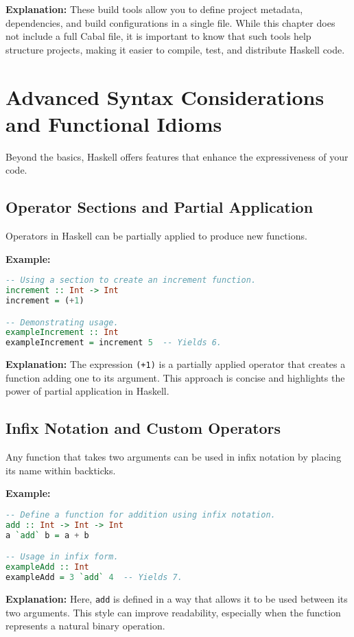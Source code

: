 \documentclass[11pt,a4paper]{article}
\begin{document}
\textbf{Explanation:}  
These build tools allow you to define project metadata, dependencies, and build configurations in a single file. While this chapter does not include a full Cabal file, it is important to know that such tools help structure projects, making it easier to compile, test, and distribute Haskell code.

\section{Advanced Syntax Considerations and Functional Idioms}
Beyond the basics, Haskell offers features that enhance the expressiveness of your code.

\subsection{Operator Sections and Partial Application}
Operators in Haskell can be partially applied to produce new functions.

\textbf{Example:}
\begin{lstlisting}[language=Haskell]
-- Using a section to create an increment function.
increment :: Int -> Int
increment = (+1)

-- Demonstrating usage.
exampleIncrement :: Int
exampleIncrement = increment 5  -- Yields 6.
\end{lstlisting}

\textbf{Explanation:}  
The expression \texttt{(+1)} is a partially applied operator that creates a function adding one to its argument. This approach is concise and highlights the power of partial application in Haskell.

\subsection{Infix Notation and Custom Operators}
Any function that takes two arguments can be used in infix notation by placing its name within backticks.

\textbf{Example:}
\begin{lstlisting}[language=Haskell]
-- Define a function for addition using infix notation.
add :: Int -> Int -> Int
a `add` b = a + b

-- Usage in infix form.
exampleAdd :: Int
exampleAdd = 3 `add` 4  -- Yields 7.
\end{lstlisting}

\textbf{Explanation:}  
Here, \texttt{add} is defined in a way that allows it to be used between its two arguments. This style can improve readability, especially when the function represents a natural binary operation.
\end{document}
